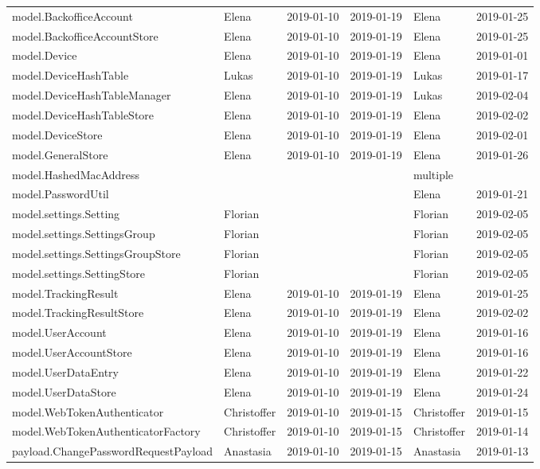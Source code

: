 \begin{adjustbox}{totalheight=\baselineskip}
\begin{tabular}{ l l r r l r }
model.BackofficeAccount & Elena & 2019-01-10 & 2019-01-19 & Elena & 2019-01-25 \\
model.BackofficeAccountStore & Elena & 2019-01-10 & 2019-01-19 & Elena & 2019-01-25 \\
model.Device & Elena & 2019-01-10 & 2019-01-19 & Elena & 2019-01-01 \\
model.DeviceHashTable & Lukas & 2019-01-10 & 2019-01-19 & Lukas & 2019-01-17 \\
model.DeviceHashTableManager & Elena & 2019-01-10 & 2019-01-19 & Lukas & 2019-02-04 \\
model.DeviceHashTableStore & Elena & 2019-01-10 & 2019-01-19 & Elena & 2019-02-02 \\
model.DeviceStore & Elena & 2019-01-10 & 2019-01-19 & Elena & 2019-02-01 \\
model.GeneralStore & Elena & 2019-01-10 & 2019-01-19 & Elena & 2019-01-26 \\
model.HashedMacAddress &  &  &  & multiple &  \\
model.PasswordUtil &  &  &  & Elena & 2019-01-21 \\
model.settings.Setting & Florian &  &  & Florian & 2019-02-05 \\
model.settings.SettingsGroup & Florian &  &  & Florian & 2019-02-05 \\
model.settings.SettingsGroupStore & Florian &  &  & Florian & 2019-02-05 \\
model.settings.SettingStore & Florian &  &  & Florian & 2019-02-05 \\
model.TrackingResult & Elena & 2019-01-10 & 2019-01-19 & Elena & 2019-01-25 \\
model.TrackingResultStore & Elena & 2019-01-10 & 2019-01-19 & Elena & 2019-02-02 \\
model.UserAccount & Elena & 2019-01-10 & 2019-01-19 & Elena & 2019-01-16 \\
model.UserAccountStore & Elena & 2019-01-10 & 2019-01-19 & Elena & 2019-01-16 \\
model.UserDataEntry & Elena & 2019-01-10 & 2019-01-19 & Elena & 2019-01-22 \\
model.UserDataStore & Elena & 2019-01-10 & 2019-01-19 & Elena & 2019-01-24 \\
model.WebTokenAuthenticator & Christoffer & 2019-01-10 & 2019-01-15 & Christoffer & 2019-01-15 \\
model.WebTokenAuthenticatorFactory & Christoffer & 2019-01-10 & 2019-01-15 & Christoffer & 2019-01-14 \\
payload.ChangePasswordRequestPayload & Anastasia & 2019-01-10 & 2019-01-15 & Anastasia & 2019-01-13 \\

\end{tabular}
\end{adjustbox}
